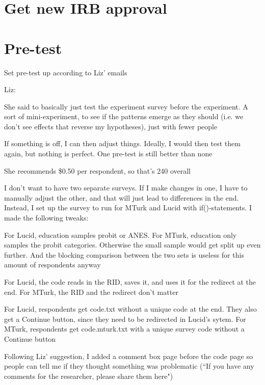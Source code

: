 \documentclass[12pt]{article}
\begin{document}
\section*{Get new IRB approval}

\vspace{0.4cm}

\section*{Pre-test}
	\begin{coi}
		\item Set pre-test up according to Liz' emails
		\item Liz:
			\begin{coi}
				\item She said to basically just test the experiment survey before the experiment. A sort of mini-experiment, to see if the patterns emerge as they should (i.e. we don't see effects that reverse my hypotheses), just with fewer people
				\item If something is off, I can then adjust things. Ideally, I would then test them again, but nothing is perfect. One pre-test is still better than none
				\item She recommends \$0.50 per respondent, so that's 240 overall
			\end{coi}
		\item I don't want to have two separate surveys. If I make changes in one, I have to manually adjust the other, and that will just lead to differences in the end. Instead, I set up the survey to run for MTurk and Lucid with if()-statements. I made the following tweaks:
			\begin{coi}
				\item For Lucid, education samples probit or ANES. For MTurk, education only samples the probit categories. Otherwise the small sample would get split up even further. And the blocking comparison between the two sets is useless for this amount of respondents anyway
				\item For Lucid, the code reads in the RID, saves it, and uses it for the redirect at the end. For MTurk, the RID and the redirect don't matter
				\item For Lucid, respondents get code.txt without a unique code at the end. They also get a Continue button, since they need to be redirected in Lucid's sytem. For MTurk, respondents get code.mturk.txt with a unique survey code without a Continue button
				\item Following Liz' suggestion, I added a comment box page before the code page so people can tell me if they thought something was problematic (``If you have any comments for the researcher, please share them here")

\end{coi}
\end{coi}
\end{document}
